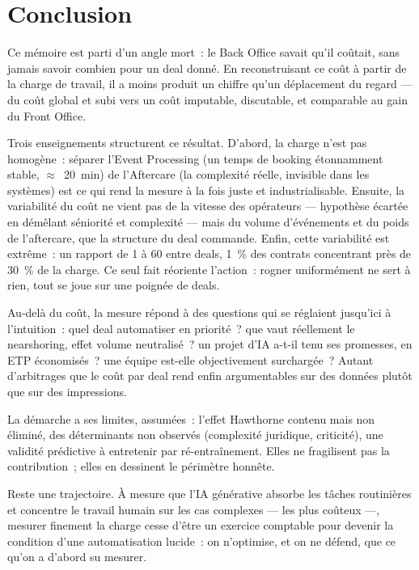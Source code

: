 \section{Conclusion}
\label{conclusion}

Ce mémoire est parti d'un angle mort~: le Back Office savait qu'il coûtait, sans
jamais savoir combien pour un deal donné. En reconstruisant ce coût à partir de la
charge de travail, il a moins produit un chiffre qu'un déplacement du regard --- du
coût global et subi vers un coût imputable, discutable, et comparable au gain du
Front Office.

Trois enseignements structurent ce résultat. D'abord, la charge n'est pas homogène~:
séparer l'Event Processing (un temps de booking étonnamment stable, $\approx$~20~min)
de l'Aftercare (la complexité réelle, invisible dans les systèmes) est ce qui rend la
mesure à la fois juste et industrialisable. Ensuite, la variabilité du coût ne vient
pas de la vitesse des opérateurs --- hypothèse écartée en démêlant séniorité et
complexité --- mais du volume d'événements et du poids de l'aftercare, que la
structure du deal commande. Enfin, cette variabilité est extrême~: un rapport de 1 à
60 entre deals, 1~\% des contrats concentrant près de 30~\% de la charge. Ce seul fait
réoriente l'action~: rogner uniformément ne sert à rien, tout se joue sur une poignée
de deals.

Au-delà du coût, la mesure répond à des questions qui se réglaient jusqu'ici à
l'intuition~: quel deal automatiser en priorité~? que vaut réellement le nearshoring,
effet volume neutralisé~? un projet d'IA a-t-il tenu ses promesses, en ETP économisés~?
une équipe est-elle objectivement surchargée~? Autant d'arbitrages que le coût par deal
rend enfin argumentables sur des données plutôt que sur des impressions.

La démarche a ses limites, assumées~: l'effet Hawthorne contenu mais non éliminé, des
déterminants non observés (complexité juridique, criticité), une validité prédictive à
entretenir par ré-entraînement. Elles ne fragilisent pas la contribution~; elles en
dessinent le périmètre honnête.

Reste une trajectoire. À mesure que l'IA générative absorbe les tâches routinières et
concentre le travail humain sur les cas complexes --- les plus coûteux ---, mesurer
finement la charge cesse d'être un exercice comptable pour devenir la condition d'une
automatisation lucide~: on n'optimise, et on ne défend, que ce qu'on a d'abord su
mesurer.
